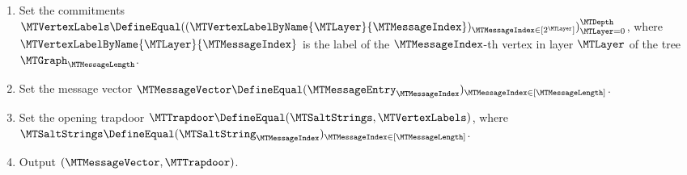 \begin{construction}
\begin{enumerate}[noitemsep]
\item Set the commitments $\MTVertexLabels \DefineEqual ((\MTVertexLabelByName{\MTLayer}{\MTMessageIndex})_{\MTMessageIndex \in [2^{\MTLayer}]})_{\MTLayer=0}^{\MTDepth}$, where $\MTVertexLabelByName{\MTLayer}{\MTMessageIndex}$ is the label of the $\MTMessageIndex$-th vertex in layer $\MTLayer$ of the tree $\MTGraph_{\MTMessageLength}$.

\item Set the message vector $\MTMessageVector \DefineEqual (\MTMessageEntry_{\MTMessageIndex})_{\MTMessageIndex \in [\MTMessageLength]}$.

\item Set the opening trapdoor $\MTTrapdoor \DefineEqual (\MTSaltStrings,\MTVertexLabels)$, where $\MTSaltStrings \DefineEqual (\MTSaltString_{\MTMessageIndex})_{\MTMessageIndex \in [\MTMessageLength]}$.

\item Output $(\MTMessageVector,\MTTrapdoor)$.

\end{enumerate}
\end{construction}



